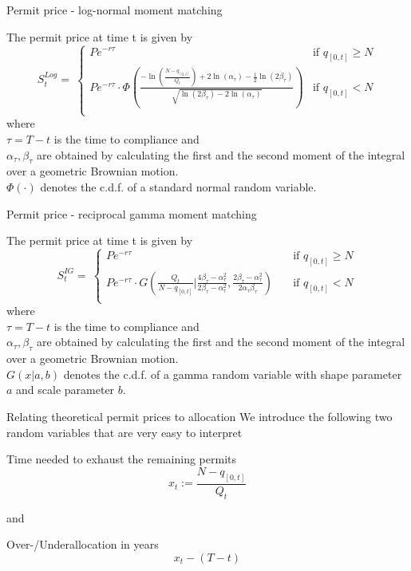 Permit price - log-normal moment matching
\begin{block}{}
    The permit price at time t is given by
	$$
	S_t^{Log} = \ \left\{
		\begin{array}{ll}
			P e^{-r\tau}
			&\mbox{if $q_{[0,t]} \ge N$} \\
			P e^{-r\tau} \cdot \Phi \left(\frac{-\ln\left( \frac{N - q_{[0,t]}}{Q_t} \right) + 2\ln(\alpha_{\tau}) - \frac{1}{2} \ln(2\beta_{\tau})}{\sqrt{\ln(2\beta_{\tau}) - 2\ln(\alpha_{\tau})}} \right) 					& \mbox{if $q_{[0,t]} < N$} \\
		\end{array} \right.
	$$
where \\
	$\tau = T - t$ is the time to compliance and \\
	$\alpha_{\tau}, \beta_{\tau}$ are obtained by calculating the first and the second moment of the integral over a geometric Brownian motion. \\
	$\Phi(\cdot)$ denotes the c.d.f. of a standard normal random variable.
\end{block}


Permit price - reciprocal gamma moment matching
    \begin{block}{}
    The permit price at time t is given by
$$
S_t^{IG}  = \ \left\{
         \begin{array}{ll}
            P e^{-r\tau}
            & \quad \mbox{if $q_{[0,t]} \ge N$} \\
            P e^{-r\tau} \cdot G \left(\frac{Q_t}{N - q_{[0,t]}} | \frac{4\beta_{\tau} - \alpha^2_{\tau}}{2\beta_{\tau} - \alpha^2_{\tau}} , \frac{2\beta_{\tau} - \alpha^2_{\tau}}{2 \alpha_{\tau} \beta_{\tau}}  \right)
            & \quad \mbox{if $q_{[0,t]} < N$} \\
         \end{array} \right.
$$
where \\
$\tau = T - t$ is the time to compliance and \\
$\alpha_{\tau}, \beta_{\tau}$ are obtained by calculating the first and the second moment of the integral over a geometric Brownian motion. \\
$G(x|a,b)$ denotes the c.d.f. of a gamma random variable with shape parameter $a$ and scale parameter $b$.
    \end{block}


Relating theoretical permit prices to allocation
	We introduce the following two random variables that are very easy to interpret
    \begin{block}{Time needed to exhaust the remaining permits}
			$$
			x_t := \frac{N - q_{[0,t]}}{Q_t}
			$$
    \end{block}
	and
		\begin{block}{Over-/Underallocation in years}
			$$
			x_t - (T-t)
			$$
    \end{block}


